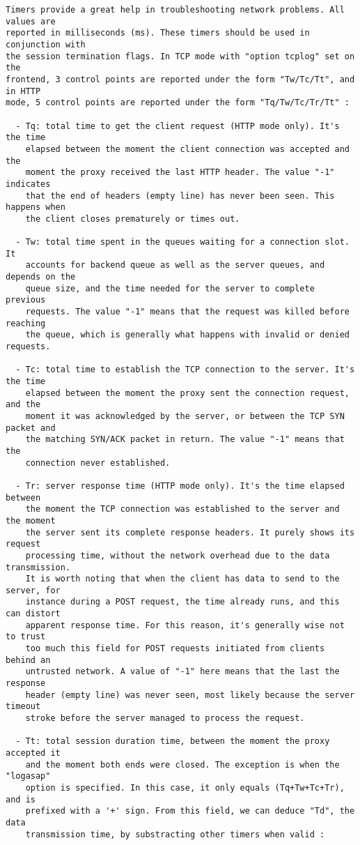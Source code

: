 \begin{verbatim}
Timers provide a great help in troubleshooting network problems. All values are
reported in milliseconds (ms). These timers should be used in conjunction with
the session termination flags. In TCP mode with "option tcplog" set on the
frontend, 3 control points are reported under the form "Tw/Tc/Tt", and in HTTP
mode, 5 control points are reported under the form "Tq/Tw/Tc/Tr/Tt" :

  - Tq: total time to get the client request (HTTP mode only). It's the time
    elapsed between the moment the client connection was accepted and the
    moment the proxy received the last HTTP header. The value "-1" indicates
    that the end of headers (empty line) has never been seen. This happens when
    the client closes prematurely or times out.

  - Tw: total time spent in the queues waiting for a connection slot. It
    accounts for backend queue as well as the server queues, and depends on the
    queue size, and the time needed for the server to complete previous
    requests. The value "-1" means that the request was killed before reaching
    the queue, which is generally what happens with invalid or denied requests.

  - Tc: total time to establish the TCP connection to the server. It's the time
    elapsed between the moment the proxy sent the connection request, and the
    moment it was acknowledged by the server, or between the TCP SYN packet and
    the matching SYN/ACK packet in return. The value "-1" means that the
    connection never established.

  - Tr: server response time (HTTP mode only). It's the time elapsed between
    the moment the TCP connection was established to the server and the moment
    the server sent its complete response headers. It purely shows its request
    processing time, without the network overhead due to the data transmission.
    It is worth noting that when the client has data to send to the server, for
    instance during a POST request, the time already runs, and this can distort
    apparent response time. For this reason, it's generally wise not to trust
    too much this field for POST requests initiated from clients behind an
    untrusted network. A value of "-1" here means that the last the response
    header (empty line) was never seen, most likely because the server timeout
    stroke before the server managed to process the request.

  - Tt: total session duration time, between the moment the proxy accepted it
    and the moment both ends were closed. The exception is when the "logasap"
    option is specified. In this case, it only equals (Tq+Tw+Tc+Tr), and is
    prefixed with a '+' sign. From this field, we can deduce "Td", the data
    transmission time, by substracting other timers when valid :


\end{verbatim}
